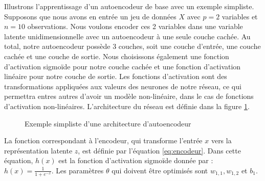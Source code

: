 Illustrons l'apprentissage d'un autoencodeur de base avec un exemple simpliste. Supposons que nous avons en entrée un jeu de données $X$ avec $p=2$ variables et $n=10$ observations. Nous voulons encoder ces 2 variables dans une variable latente unidimensionnelle avec un autoencodeur à une seule couche cachée. Au total, notre autoencodeur possède 3 couches, soit une couche d'entrée, une couche cachée et une couche de sortie. Nous choisissons également une fonction d'activation sigmoïde pour notre couche cachée et une fonction d'activation linéaire pour notre couche de sortie. Les fonctions d'activation sont des transformations appliquées aux valeurs des neurones de notre réseau, ce qui permettra entres autres d'avoir un modèle non-linéaire, dans le cas de fonctions d'activation non-linéaires. L'architecture du réseau est définie dans la figure \ref{fig:toyAE}.

\begin{figure}[htb]
	\centering
	\caption{Exemple simpliste d'une architecture d'autoencodeur}
	\label{fig:toyAE}
\end{figure}

La fonction correspondant à l'encodeur, qui transforme l'entrée $x$ vers la représentation latente $z$, est définie par l'équation \ref{eq:encodeur}. Dans cette équation, $h(x)$ est la fonction d'activation sigmoïde donnée par : $h(x)=\frac{1}{1+e^{-x}}$. Les paramètres $\theta$ qui doivent être optimisés sont $w_{1,1}, w_{1,2}$ et $b_1$. 

